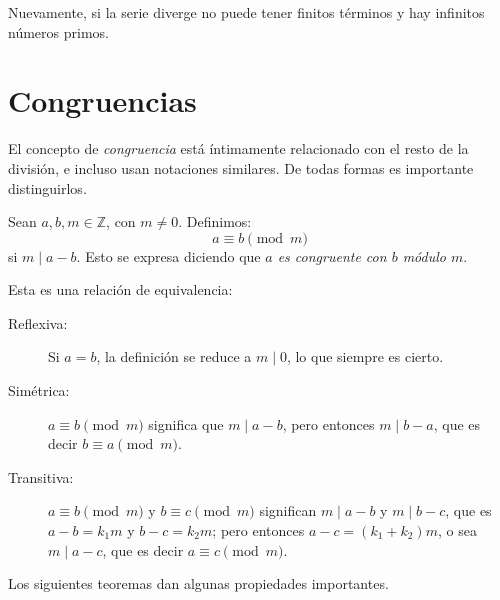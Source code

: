   Nuevamente,
  si la serie diverge no puede tener finitos términos
  y hay infinitos números primos.

\section{Congruencias}
\label{sec:congruencias}

  El concepto de \emph{congruencia} está íntimamente relacionado
  con el resto de la división,
  e incluso usan notaciones similares.
  De todas formas es importante distinguirlos.
  \begin{definition}
    \label{def:Z:congruence}
    Sean \(a, b, m \in \mathbb{Z}\),
    con \(m \ne 0\).
    Definimos:
    \begin{equation*}
      a \equiv b \pmod{m}
    \end{equation*}
    si \(m \mid a - b\).
    Esto se expresa diciendo
    que \emph{\(a\) es congruente con \(b\) módulo \(m\)}.
  \end{definition}
  Esta es una relación de equivalencia:%
  \begin{description}
  \item[Reflexiva:]
    Si \(a = b\),
    la definición se reduce a \(m \mid 0\),
    lo que siempre es cierto.
  \item[Simétrica:]
    \(a \equiv b \pmod{m}\) significa que \(m \mid a - b\),
    pero entonces \(m \mid b - a\),
    que es decir \(b \equiv a \pmod{m}\).
  \item[Transitiva:]
    \(a \equiv b \pmod{m}\) y \(b \equiv c \pmod{m}\)
    significan \(m \mid a - b\) y \(m \mid b - c\),
    que es \(a - b = k_1 m\) y \(b - c = k_2 m\);
    pero entonces \(a - c = (k_1 + k_2) m\),
    o sea \(m \mid a - c\),
    que es decir \(a \equiv c \pmod{m}\).
  \end{description}
  Los siguientes teoremas dan algunas propiedades importantes.

